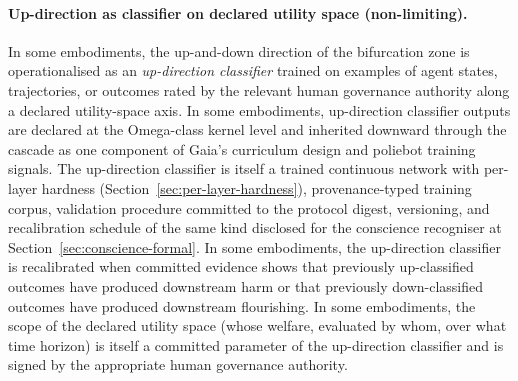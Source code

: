 \documentclass[a4paper,12pt]{article}
\begin{document}
\paragraph{Up-direction as classifier on declared utility space
(non-limiting).}
In some embodiments, the up-and-down direction of the bifurcation
zone is operationalised as an \emph{up-direction classifier} trained
on examples of agent states, trajectories, or outcomes rated by the
relevant human governance authority along a declared utility-space
axis. In some embodiments, up-direction classifier outputs are
declared at the Omega-class kernel level and inherited downward
through the cascade as one component of Gaia's curriculum design and
poliebot training signals. The up-direction classifier is itself a
trained continuous network with per-layer hardness
(Section~\ref{sec:per-layer-hardness}), provenance-typed training
corpus, validation procedure committed to the protocol digest,
versioning, and recalibration schedule of the same kind disclosed
for the conscience recogniser at Section~\ref{sec:conscience-formal}.
In some embodiments, the up-direction classifier is recalibrated
when committed evidence shows that previously up-classified outcomes
have produced downstream harm or that previously down-classified
outcomes have produced downstream flourishing. In some embodiments,
the scope of the declared utility space (whose welfare, evaluated by
whom, over what time horizon) is itself a committed parameter of the
up-direction classifier and is signed by the appropriate human
governance authority.
\end{document}
